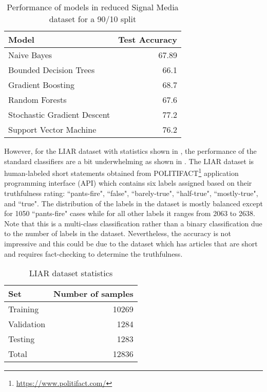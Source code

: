 \begin{table}[h]
\begin{center}
\caption{Performance of models in reduced Signal Media dataset for a 90/10 split}
\label{tbl:signal_media_performance}
\begin{tabular}{lr}
\toprule 
Model&Test Accuracy\\
\midrule 
Naive Bayes&67.89\\
Bounded Decision Trees&66.1\\
Gradient Boosting&68.7\\
Random Forests&67.6\\
Stochastic Gradient Descent&77.2\\
Support Vector Machine&76.2\\
\bottomrule
\end{tabular}
\end{center}
\end{table}

However, for the LIAR\cite{wang2017liar} dataset with statistics shown in , the performance of the standard classifiers are a bit underwhelming as shown in  \cite{wang2017liar}. The LIAR dataset is human-labeled short statements obtained from POLITIFACT\footnote{\url{https://www.politifact.com/}} application programming interface (API) which contains six labels assigned based on their truthfulness rating: ``pants-fire", ``false", ``barely-true", ``half-true", ``mostly-true", and ``true". The distribution of the labels in the dataset is mostly balanced except for 1050 ``pants-fire" cases while for all other labels it ranges from 2063 to 2638. Note that this is a multi-class classification rather than a binary classification due to the number of labels in the dataset. Nevertheless, the accuracy is not impressive and this could be due to the dataset
which has articles that are short and requires fact-checking to determine the truthfulness.

\begin{table}[h]
\begin{center}
\caption{LIAR dataset statistics}
\label{tbl:liar_statistics}
\begin{tabular}{lr}
\toprule 
Set & Number of samples \\
\midrule 
Training & 10269 \\
Validation & 1284 \\
Testing & 1283 \\
\bottomrule
Total & 12836
\end{tabular}
\end{center}
\end{table}

